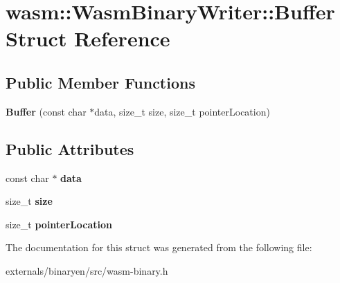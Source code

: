 \hypertarget{structwasm_1_1_wasm_binary_writer_1_1_buffer}{}\section{wasm\+:\+:Wasm\+Binary\+Writer\+:\+:Buffer Struct Reference}
\label{structwasm_1_1_wasm_binary_writer_1_1_buffer}
\subsection*{Public Member Functions}
\begin{DoxyCompactItemize}
\item 
\mbox{\label{structwasm_1_1_wasm_binary_writer_1_1_buffer_a1821a89d7bd7c33eb1fd8bd5117fe7e8}} 
{\bfseries Buffer} (const char $\ast$data, size\+\_\+t size, size\+\_\+t pointer\+Location)
\end{DoxyCompactItemize}
\subsection*{Public Attributes}
\begin{DoxyCompactItemize}
\item 
\mbox{\label{structwasm_1_1_wasm_binary_writer_1_1_buffer_adffe0f6f279674294a06cf76b35fd2b0}} 
const char $\ast$ {\bfseries data}
\item 
\mbox{\label{structwasm_1_1_wasm_binary_writer_1_1_buffer_abe54d6cea496b67438d2aaff12c1094e}} 
size\+\_\+t {\bfseries size}
\item 
\mbox{\label{structwasm_1_1_wasm_binary_writer_1_1_buffer_a5fd19d75b71082c6c4bac97d424404c0}} 
size\+\_\+t {\bfseries pointer\+Location}
\end{DoxyCompactItemize}


The documentation for this struct was generated from the following file\+:\begin{DoxyCompactItemize}
\item 
externals/binaryen/src/wasm-\/binary.\+h\end{DoxyCompactItemize}
